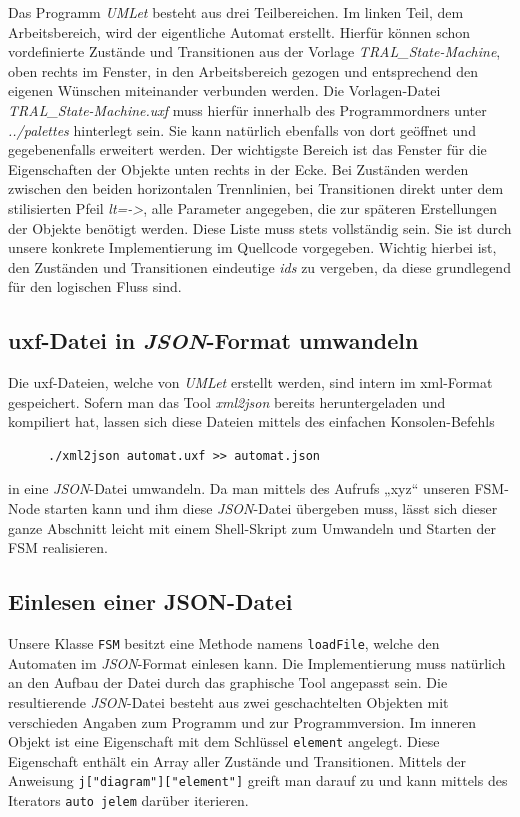 Das Programm \textit{UMLet} besteht aus drei Teilbereichen. Im linken Teil, dem
Arbeitsbereich, wird der eigentliche Automat erstellt. Hierfür können schon
vordefinierte Zustände und Transitionen aus der Vorlage \textit{TRAL\_State-Machine},
oben rechts im Fenster, in den Arbeitsbereich gezogen und entsprechend den eigenen Wünschen
miteinander verbunden werden. Die Vorlagen-Datei \textit{TRAL\_State-Machine.uxf} muss
hierfür innerhalb des Programmordners unter \textit{../palettes} hinterlegt sein.
Sie kann natürlich ebenfalls von dort geöffnet und gegebenenfalls erweitert
werden.
Der wichtigste Bereich ist das Fenster für die Eigenschaften der Objekte unten rechts in der Ecke.
Bei Zuständen werden zwischen den beiden horizontalen Trennlinien, bei
Transitionen direkt unter dem stilisierten Pfeil \textit{lt=->}, alle Parameter
angegeben, die zur späteren Erstellungen der Objekte benötigt werden. Diese
Liste muss stets vollständig sein. Sie ist durch unsere konkrete
Implementierung im Quellcode vorgegeben.
Wichtig hierbei ist, den Zuständen und Transitionen eindeutige \textit{ids} zu
vergeben, da diese grundlegend für den logischen Fluss sind.


\subsection{uxf-Datei in \textit{JSON}-Format umwandeln}
Die uxf-Dateien, welche von \textit{UMLet} erstellt werden, sind intern im xml-Format
gespeichert. Sofern man das Tool \textit{xml2json} bereits heruntergeladen und
kompiliert hat, lassen sich diese Dateien mittels des einfachen Konsolen-Befehls

\begin{figure}[thp]
\begin{lstlisting}[style=json]
./xml2json automat.uxf >> automat.json

\end{lstlisting}
\centering
\end{figure}

in eine \textit{JSON}-Datei umwandeln.
Da man mittels des Aufrufs „xyz“ unseren FSM-Node starten kann und ihm diese
\textit{JSON}-Datei übergeben muss, lässt sich dieser ganze Abschnitt leicht mit einem
Shell-Skript zum Umwandeln und Starten der FSM realisieren.


\subsection{Einlesen einer JSON-Datei}
Unsere Klasse \texttt{FSM} besitzt eine Methode namens \texttt{loadFile}, welche den Automaten
im \textit{JSON}-Format einlesen kann. Die Implementierung muss natürlich an den Aufbau
der Datei durch das graphische Tool angepasst sein. Die resultierende
\textit{JSON}-Datei besteht aus zwei geschachtelten Objekten mit verschieden Angaben zum
Programm und zur Programmversion. Im inneren Objekt ist eine Eigenschaft mit dem
Schlüssel \texttt{element} angelegt. Diese Eigenschaft enthält ein Array aller Zustände
und Transitionen.
Mittels der Anweisung \texttt{j["diagram"]["{}element"]} greift man
darauf zu und kann mittels des Iterators \texttt{auto jelem} darüber iterieren.

